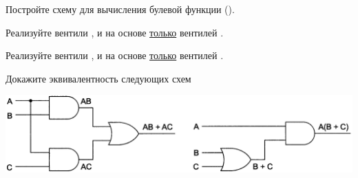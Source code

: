 \ExercisesSection
\begin{exercise}
\item Постройте схему для вычисления булевой функции  ().

\item Реализуйте вентили ,  и  на основе \underline{только} вентилей .

\item Реализуйте вентили ,  и  на основе \underline{только} вентилей .

\item Докажите эквивалентность следующих схем
\begin{center}
  \includegraphics[width=0.8\columnwidth]{images/ex_eq_gates.png}
\end{center}

\end{exercise}
